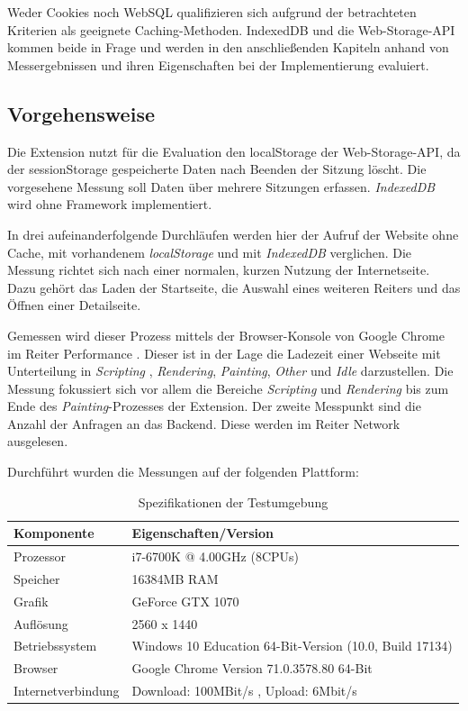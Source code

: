 Weder Cookies noch WebSQL qualifizieren sich aufgrund der betrachteten Kriterien als geeignete Caching-Methoden. IndexedDB und die Web-Storage-API kommen beide in Frage und werden in den anschließenden Kapiteln anhand von Messergebnissen und ihren Eigenschaften bei der Implementierung evaluiert.

\subsection{Vorgehensweise}
\label{ss:vorgehensweise}

Die Extension nutzt für die Evaluation den \glqq localStorage \grqq{} der Web-Storage-API, da der \glqq sessionStorage \grqq{} gespeicherte Daten nach Beenden der Sitzung löscht. Die vorgesehene Messung soll Daten über mehrere Sitzungen erfassen. \textit{IndexedDB} wird ohne Framework implementiert.

In drei aufeinanderfolgende Durchläufen werden hier der Aufruf der Website ohne Cache, mit vorhandenem \textit{localStorage} und mit \textit{IndexedDB} verglichen. Die Messung richtet sich nach einer normalen, kurzen Nutzung der Internetseite. Dazu gehört das Laden der Startseite, die Auswahl eines weiteren Reiters und das Öffnen einer Detailseite. 

Gemessen wird dieser Prozess mittels der Browser-Konsole von Google Chrome im Reiter \glqq Performance \grqq{}. Dieser ist in der Lage die Ladezeit einer Webseite mit Unterteilung in \textit{Scripting} , \textit{Rendering}, \textit{Painting}, \textit{Other} und \textit{Idle} darzustellen. Die Messung fokussiert sich vor allem die Bereiche \textit{Scripting} und \textit{Rendering} bis zum Ende des \textit{Painting}-Prozesses der Extension. Der zweite Messpunkt sind die Anzahl der Anfragen an das Backend. Diese werden im Reiter \glqq Network \grqq ausgelesen.

Durchführt wurden die Messungen auf der folgenden Plattform:
\begin{table}[h]
	\begin{tabular}{p{4.6cm}R{7.0cm}}
		\toprule
		\textbf{Komponente}	&	\textbf{Eigenschaften/Version}	\\
		\midrule
		Prozessor	&	i7-6700K @ 4.00GHz (8CPUs)	\\
		Speicher	&	16384MB RAM	\\
		Grafik	&	GeForce GTX 1070	\\
		Auflösung	&	2560 x 1440	\\
		\midrule
		Betriebssystem	&	Windows 10 Education 64-Bit-Version (10.0, Build 17134)	\\
		Browser	&	Google Chrome Version 71.0.3578.80 64-Bit	\\
		Internetverbindung	&	Download: 100MBit/s , Upload: 6Mbit/s	\\
		\bottomrule
	\end{tabular}
	\caption{Spezifikationen der Testumgebung}
	\label{cache3}
\end{table}

